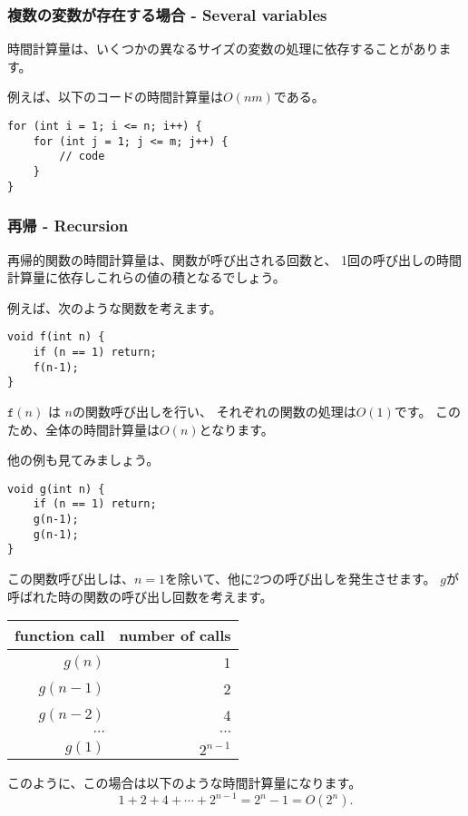 \subsubsection*{複数の変数が存在する場合 - Several variables}

時間計算量は、いくつかの異なるサイズの変数の処理に依存することがあります。

例えば、以下のコードの時間計算量は$O(nm)$である。

\begin{lstlisting}
for (int i = 1; i <= n; i++) {
    for (int j = 1; j <= m; j++) {
        // code
    }
}
\end{lstlisting}

\subsubsection*{再帰 - Recursion}

再帰的関数の時間計算量は、関数が呼び出される回数と、
1回の呼び出しの時間計算量に依存しこれらの値の積となるでしょう。

例えば、次のような関数を考えます。

\begin{lstlisting}
void f(int n) {
    if (n == 1) return;
    f(n-1);
}
\end{lstlisting}
$\texttt{f}(n)$ は $n$の関数呼び出しを行い、
それぞれの関数の処理は$O(1)$です。
このため、全体の時間計算量は$O(n)$となります。

他の例も見てみましょう。
\begin{lstlisting}
void g(int n) {
    if (n == 1) return;
    g(n-1);
    g(n-1);
}
\end{lstlisting}

この関数呼び出しは、$n = 1$を除いて、他に2つの呼び出しを発生させます。
$g$が呼ばれた時の関数の呼び出し回数を考えます。

\begin{center}
\begin{tabular}{rr}
function call & number of calls \\
\hline
$g(n)$ & 1 \\
$g(n-1)$ & 2 \\
$g(n-2)$ & 4 \\
$\cdots$ & $\cdots$ \\
$g(1)$ & $2^{n-1}$ \\
\end{tabular}
\end{center}
このように、この場合は以下のような時間計算量になります。
\[1+2+4+\cdots+2^{n-1} = 2^n-1 = O(2^n).\]

